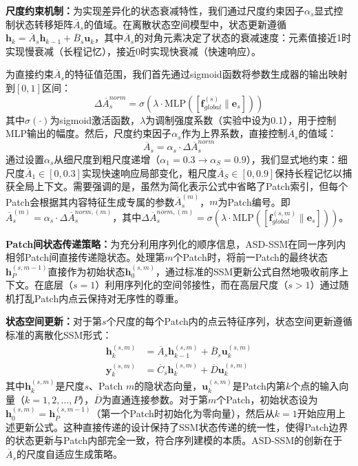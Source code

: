 \documentclass[preprint,12pt]{elsarticle}
\begin{document}
\textbf{尺度约束机制：}为实现差异化的状态衰减特性，我们通过尺度约束因子$\alpha_s$显式控制状态转移矩阵$\overline{A}_s$的值域。在离散状态空间模型中，状态更新遵循$\mathbf{h}_k = \overline{A}_s \mathbf{h}_{k-1} + \overline{B}_s \mathbf{u}_k$，其中$\overline{A}_s$的对角元素决定了状态的衰减速度：元素值接近1时实现慢衰减（长程记忆），接近0时实现快衰减（快速响应）。

为直接约束$\overline{A}_s$的特征值范围，我们首先通过sigmoid函数将参数生成器的输出映射到$[0,1]$区间：
\begin{equation}
	\Delta\overline{A}_s^{norm} = \sigma(\lambda \cdot \text{MLP}([\mathbf{f}_{global}^{(s)} \| \mathbf{e}_s]))
	\label{eq:param_norm}
\end{equation}
其中$\sigma(\cdot)$为sigmoid激活函数，$\lambda$为调制强度系数（实验中设为0.1），用于控制MLP输出的幅度。然后，尺度约束因子$\alpha_s$作为上界系数，直接控制$\overline{A}_s$的值域：
\begin{equation}
	\overline{A}_s = \alpha_s \cdot \Delta\overline{A}_s^{norm}
	\label{eq:param_modulation}
\end{equation}
通过设置$\alpha_s$从细尺度到粗尺度递增（$\alpha_1=0.3 \rightarrow \alpha_S=0.9$），我们显式地约束：细尺度$\overline{A}_1 \in [0, 0.3]$实现快速响应局部变化，粗尺度$\overline{A}_S \in [0, 0.9]$保持长程记忆以捕获全局上下文。需要强调的是，虽然为简化表示公式中省略了Patch索引，但每个Patch会根据其内容特征生成专属的参数$\overline{A}_s^{(m)}$，$m$为Patch编号。即$\overline{A}_s^{(m)} = \alpha_s \cdot \Delta\overline{A}_s^{norm,(m)}$，其中$\Delta\overline{A}_s^{norm,(m)} = \sigma(\lambda \cdot \text{MLP}([\mathbf{f}_{global}^{(s,m)} \| \mathbf{e}_s]))$。

\textbf{Patch间状态传递策略：}为充分利用序列化的顺序信息，ASD-SSM在同一序列内相邻Patch间直接传递隐状态。处理第$m$个Patch时，将前一Patch的最终状态$\mathbf{h}_P^{(s,m-1)}$直接作为初始状态$\mathbf{h}_0^{(s,m)}$，通过标准的SSM更新公式自然地吸收前序上下文。在底层（$s=1$）利用序列化的空间邻接性，而在高层尺度（$s>1$）通过随机打乱Patch内点云保持对无序性的尊重。

\textbf{状态空间更新：}对于第$s$个尺度的每个Patch内的点云特征序列，状态空间更新遵循标准的离散化SSM形式\cite{Mamba}：
\begin{equation}
	\begin{aligned}
		\mathbf{h}_k^{(s,m)} &= \overline{A}_s \mathbf{h}_{k-1}^{(s,m)} + \overline{B}_s \mathbf{u}_k^{(s,m)} \\
		\mathbf{y}_k^{(s,m)} &= \overline{C}_s \mathbf{h}_k^{(s,m)} + \overline{D} \mathbf{u}_k^{(s,m)}
	\end{aligned}
	\label{eq:asd_ssm_update}
\end{equation}
其中$\mathbf{h}_k^{(s,m)}$是尺度$s$、Patch $m$的隐状态向量，$\mathbf{u}_k^{(s,m)}$是Patch内第$k$个点的输入向量（$k=1,2,\ldots,P$），$\overline{D}$为直通连接参数。对于第$m$个Patch，初始状态设为$\mathbf{h}_0^{(s,m)} = \mathbf{h}_P^{(s,m-1)}$（第一个Patch时初始化为零向量），然后从$k=1$开始应用上述更新公式。这种直接传递的设计保持了SSM状态传递的统一性，使得Patch边界的状态更新与Patch内部完全一致，符合序列建模的本质。ASD-SSM的创新在于$\overline{A}_s$的尺度自适应生成策略。
\end{document}
